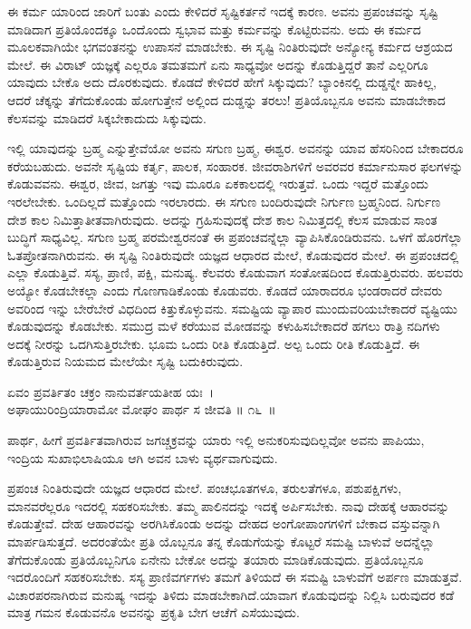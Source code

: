 ಈ ಕರ್ಮ ಯಾರಿಂದ ಜಾರಿಗೆ ಬಂತು ಎಂದು ಕೇಳಿದರೆ ಸೃಷ್ಟಿಕರ್ತನೆ ಇದಕ್ಕೆ ಕಾರಣ. ಅವನು ಪ್ರಪಂಚವನ್ನು ಸೃಷ್ಟಿ ಮಾಡಿದಾಗ ಪ್ರತಿಯೊಂದಕ್ಕೂ ಒಂದೊಂದು ಸ್ವಭಾವ ಮತ್ತು ಕರ್ಮವನ್ನು ಕೊಟ್ಟಿರುವನು. ಅದು ಈ ಕರ್ಮದ ಮೂಲಕವಾಗಿಯೇ ಭಗವಂತನನ್ನು ಉಪಾಸನೆ ಮಾಡಬೇಕು. ಈ ಸೃಷ್ಟಿ ನಿಂತಿರುವುದೇ ಅನ್ಯೋನ್ಯ ಕರ್ಮದ ಆಶ್ರಯದ ಮೇಲೆ. ಈ ವಿರಾಟ್ ಯಜ್ಞಕ್ಕೆ ಎಲ್ಲರೂ ತಮತಮಗೆ ಏನು ಸಾಧ್ಯವೋ ಅದನ್ನು ಕೊಡುತ್ತಿದ್ದರೆ ತಾನೆ ಎಲ್ಲರಿಗೂ ಯಾವುದು ಬೇಕೊ ಅದು ದೊರಕುವುದು. ಕೊಡದೆ ಕೇಳಿದರೆ ಹೇಗೆ ಸಿಕ್ಕುವುದು? ಬ್ಯಾಂಕಿನಲ್ಲಿ ದುಡ್ಡನ್ನೇ ಹಾಕಿಲ್ಲ, ಆದರೆ ಚೆಕ್ಕನ್ನು ತೆಗೆದುಕೊಂಡು ಹೋಗುತ್ತೇನೆ ಅಲ್ಲಿಂದ ದುಡ್ಡನ್ನು ತರಲು! ಪ್ರತಿಯೊಬ್ಬನೂ ಅವನು ಮಾಡಬೇಕಾದ ಕೆಲಸವನ್ನು ಮಾಡಿದರೆ ಸಿಕ್ಕಬೇಕಾದುದು ಸಿಕ್ಕುವುದು.

ಇಲ್ಲಿ ಯಾವುದನ್ನು ಬ್ರಹ್ಮ ಎನ್ನುತ್ತೇವೆಯೋ ಅವನು ಸಗುಣ ಬ್ರಹ್ಮ, ಈಶ್ವರ. ಅವನನ್ನು ಯಾವ ಹೆಸರಿನಿಂದ ಬೇಕಾದರೂ ಕರೆಯಬಹುದು. ಅವನೇ ಸೃಷ್ಟಿಯ ಕರ್ತೃ, ಪಾಲಕ, ಸಂಹಾರಕ. ಜೀವರಾಶಿಗಳಿಗೆ ಅವರವರ ಕರ್ಮಾನುಸಾರ ಫಲಗಳನ್ನು ಕೊಡುವವನು. ಈಶ್ವರ, ಜೀವ, ಜಗತ್ತು ಇವು ಮೂರೂ ಏಕಕಾಲದಲ್ಲಿ ಇರುತ್ತವೆ. ಒಂದು ಇದ್ದರೆ ಮತ್ತೊಂದು ಇರಲೇಬೇಕು. ಒಂದಿಲ್ಲದೆ ಮತ್ತೊಂದು ಇರಲಾರದು. ಈ ಸಗುಣ ಬಂದಿರುವುದೇ ನಿರ್ಗುಣ ಬ್ರಹ್ಮನಿಂದ. ನಿರ್ಗುಣ ದೇಶ ಕಾಲ ನಿಮಿತ್ತಾತೀತವಾಗಿರುವುದು. ಅದನ್ನು ಗ್ರಹಿಸುವುದಕ್ಕೆ ದೇಶ ಕಾಲ ನಿಮಿತ್ತದಲ್ಲಿ ಕೆಲಸ ಮಾಡುವ ಸಾಂತ ಬುದ್ಧಿಗೆ ಸಾಧ್ಯವಿಲ್ಲ. ಸಗುಣ ಬ್ರಹ್ಮ ಪರಮೇಶ್ವರನಂತೆ ಈ ಪ್ರಪಂಚವನ್ನೆಲ್ಲಾ ವ್ಯಾಪಿಸಿಕೊಂಡಿರುವನು. ಒಳಗೆ ಹೊರಗೆಲ್ಲಾ ಓತಪ್ರೋತನಾಗಿರುವನು. ಈ ಸೃಷ್ಟಿ ನಿಂತಿರುವುದೇ ಯಜ್ಞದ ಆಧಾರದ ಮೇಲೆ, ಕೊಡುವುದರ ಮೇಲೆ. ಈ ಪ್ರಪಂಚದಲ್ಲಿ ಎಲ್ಲಾ ಕೊಡುತ್ತಿವೆ. ಸಸ್ಯ, ಪ್ರಾಣಿ, ಪಕ್ಷಿ, ಮನುಷ್ಯ. ಕೆಲವರು ಕೊಡುವಾಗ ಸಂತೋಷದಿಂದ ಕೊಡುತ್ತಿರುವರು. ಹಲವರು ಅಯ್ಯೋ ಕೊಡಬೇಕಲ್ಲಾ ಎಂದು ಗೊಣಗಾಡಿಕೊಂಡು ಕೊಡುವರು. ಕೊಡದೆ ಯಾರಾದರೂ ಭಂಡರಾದರೆ ದೇವರು ಅವರಿಂದ ಇನ್ನು ಬೇರೆಬೇರೆ ವಿಧದಿಂದ ಕಿತ್ತುಕೊಳ್ಳುವನು. ಸಮಷ್ಟಿಯ ವ್ಯಾಪಾರ ಮುಂದುವರಿಯಬೇಕಾದರೆ ವ್ಯಷ್ಟಿಯು ಕೊಡುವುದನ್ನು ಕೊಡಬೇಕು. ಸಮುದ್ರ ಮಳೆ ಕರೆಯುವ ಮೋಡವನ್ನು ಕಳುಹಿಸಬೇಕಾದರೆ ಹಗಲು ರಾತ್ರಿ ನದಿಗಳು ಅದಕ್ಕೆ ನೀರನ್ನು ಒದಗಿಸುತ್ತಿರಬೇಕು. ಭೂಮ ಒಂದು ರೀತಿ ಕೊಡುತ್ತಿದೆ. ಅಲ್ಪ ಒಂದು ರೀತಿ ಕೊಡುತ್ತಿದೆ. ಈ ಕೊಡುತ್ತಿರುವ ನಿಯಮದ ಮೇಲೆಯೇ ಸೃಷ್ಟಿ ಬದುಕಿರುವುದು.

\begin{shloka}
ಏವಂ ಪ್ರವರ್ತಿತಂ ಚಕ್ರಂ ನಾನುವರ್ತಯತೀಹ ಯಃ~।\\ಅಘಾಯುರಿಂದ್ರಿಯಾರಾಮೋ ಮೋಘಂ ಪಾರ್ಥ ಸ ಜೀವತಿ \hfill॥ ೧೬~॥
\end{shloka}

\begin{artha}
ಪಾರ್ಥ, ಹೀಗೆ ಪ್ರವರ್ತಿತವಾಗಿರುವ ಜಗಚ್ಚಕ್ರವನ್ನು ಯಾರು ಇಲ್ಲಿ ಅನುಕರಿಸುವು\-ದಿಲ್ಲವೋ ಅವನು ಪಾಪಿಯು, ಇಂದ್ರಿಯ ಸುಖಾಭಿಲಾಷಿಯೂ ಆಗಿ ಅವನ ಬಾಳು ವ್ಯರ್ಥವಾಗುವುದು.
\end{artha}

ಪ್ರಪಂಚ ನಿಂತಿರುವುದೇ ಯಜ್ಞದ ಆಧಾರದ ಮೇಲೆ. ಪಂಚಭೂತಗಳೂ, ತರುಲತೆಗಳೂ, ಪಶುಪಕ್ಷಿಗಳು, ಮಾನವರೆಲ್ಲರೂ ಇದರಲ್ಲಿ ಸಹಕರಿಸಬೇಕು. ತಮ್ಮ ಪಾಲಿನದನ್ನು ಇದಕ್ಕೆ ಅರ್ಪಿಸಬೇಕು. ನಾವು ದೇಹಕ್ಕೆ ಆಹಾರವನ್ನು ಕೊಡುತ್ತೇವೆ. ದೇಹ ಆಹಾರವನ್ನು ಅರಗಿಸಿಕೊಂಡು ಅದನ್ನು ದೇಹದ ಅಂಗೋಪಾಂಗಗಳಿಗೆ ಬೇಕಾದ ವಸ್ತುವನ್ನಾಗಿ ಮಾರ್ಪಡಿಸುತ್ತದೆ. ಅದರಂತೆಯೇ ಪ್ರತಿ ಯೊಬ್ಬನೂ ತನ್ನ ಕೊಡುಗೆಯನ್ನು ಕೊಟ್ಟರೆ ಸಮಷ್ಟಿ ಬಾಳುವೆ ಅದನ್ನೆಲ್ಲಾ ತೆಗೆದುಕೊಂಡು ಪ್ರತಿಯೊಬ್ಬನಿಗೂ ಏನೇನು ಬೇಕೋ ಅದನ್ನು ತಯಾರು ಮಾಡಿಕೊಡುವುದು. ಪ್ರತಿಯೊಬ್ಬನೂ ಇದರೊಂದಿಗೆ ಸಹಕರಿಸಬೇಕು. ಸಸ್ಯ ಪ್ರಾಣಿವರ್ಗಗಳು ತಮಗೆ ತಿಳಿಯದೆ ಈ ಸಮಷ್ಟಿ ಬಾಳುವೆಗೆ ಅರ್ಪಣ ಮಾಡುತ್ತವೆ. ವಿಚಾರಪರನಾಗಿರುವ ಮನುಷ್ಯ ಇದನ್ನು ತಿಳಿದು ಮಾಡಬೇಕಾಗಿದೆ.\break ಯಾವಾಗ ಕೊಡುವುದನ್ನು ನಿಲ್ಲಿಸಿ ಬರುವುದರ ಕಡೆ ಮಾತ್ರ ಗಮನ ಕೊಡುವನೊ ಅವನನ್ನು ಪ್ರಕೃತಿ ಬೇಗ ಆಚೆಗೆ ಎಸೆಯುವುದು.


